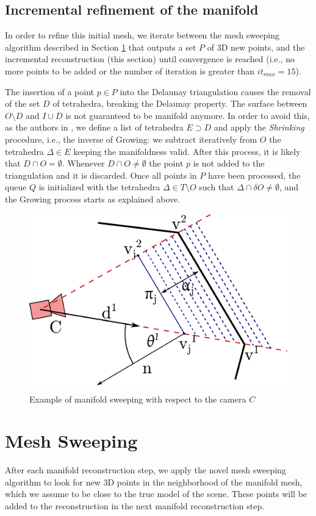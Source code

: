 \subsection{Incremental refinement of the manifold}
In order to refine this initial mesh, we iterate between the mesh sweeping algorithm described in Section \ref{sec:sweep} that outputs a set $P$ of 3D new points, and the incremental reconstruction (this section)  until convergence is reached (i.e., no more points to be added or the number of iteration is greater than $it_{max} = 15$).

The insertion of a point $p\in P$  into the Delaunay triangulation causes the removal of the set $D$ of tetrahedra, breaking the Delaunay property. The surface between $O \setminus D$ and $I \cup D$ is not guaranteed to be manifold anymore. 
In order to avoid this, as the authors in \cite{litvinov_lhuillier_13}, we define a list of tetrahedra $E \supset D$ and apply the \emph{Shrinking} procedure, i.e., the inverse of Growing:  we subtract iteratively from $O$ the tetrahedra  $\Delta \in E$ keeping the manifoldness valid.
After this process, it is likely that $D \cap O = \emptyset$.
Whenever $D \cap O \neq \emptyset$ the point $p$ is not added to the triangulation and it is discarded.
Once all points in $P$ have been processed, the queue $Q$ is initialized with the tetrahedra $\Delta \in T \setminus O$ such that  $\Delta \cap \delta O \neq \emptyset$, and the Growing process starts as explained above.


\begin{figure}[tp]
  \centering
  \includegraphics[height=0.3\textwidth]{././img/sweep.pdf}
  \caption{Example of manifold sweeping with respect to the camera $C$}
  \label{fig:sweep}
\end{figure}


 

\section{Mesh Sweeping}
\label{sec:sweep}
After each manifold reconstruction step, we apply the novel mesh sweeping algorithm to look for new 3D points in the neighborhood of the manifold mesh, which we assume to be close to the true model of the scene.
These points will be added to the reconstruction in the next manifold reconstruction step.

